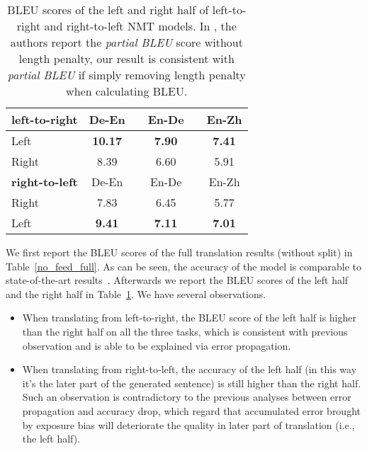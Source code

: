 \documentclass[11pt,a4paper]{article}
\begin{document}
\begin{table}[!tbp]
\small
\centering %

\begin{tabular}{ l  c  c  c  c  c } %
\toprule
\textbf{left-to-right}  & De-En & & En-De & & En-Zh \\
\midrule
Left & \textbf{10.17} & & \textbf{7.90} & & \textbf{7.41} \\
Right & 8.39 & & 6.60 & & 5.91 \\

\bottomrule\bottomrule
\textbf{right-to-left} & De-En & & En-De & & En-Zh  \\
\midrule
Right & 7.83 &  & 6.45 &  & 5.77   \\
Left & \textbf{9.41} &  & \textbf{7.11} &  & \textbf{7.01}    \\
\bottomrule
\end{tabular}
\caption{BLEU scores of the left and right half of left-to-right and right-to-left NMT models. In \cite{DBLP:conf/aaai/LiuFUS16}, the authors report the \emph{partial BLEU} score without length penalty, our result is consistent with \emph{partial BLEU} if simply removing length penalty when calculating BLEU.}
\label{r2l_no_feed}
\end{table}

We first report the BLEU scores of the full translation results (without split) in Table~\ref{no_feed_full}. As can be seen, the accuracy of the model is comparable to state-of-the-art results~\cite{DBLP:conf/nips/VaswaniSPUJGKP17,DBLP:conf/wmt/WangCJYCLSWY17,Wang2018Dual}. Afterwards we report the BLEU scores of the left half and the right half in Table~\ref{r2l_no_feed}. We have several observations.


\begin{itemize}
\item When translating from left-to-right, the BLEU score of the left half is higher than the right half on all the three tasks, which is consistent with previous observation and is able to be explained via error propagation.

\item When translating from right-to-left, the accuracy of the left half (in this way it's the later part of the generated sentence) is still higher than the right half. Such an observation is contradictory to the previous analyses between error propagation and accuracy drop, which regard that accumulated error brought by exposure bias will deteriorate the quality in later part of translation (i.e., the left half).
\end{itemize}
\end{document}
